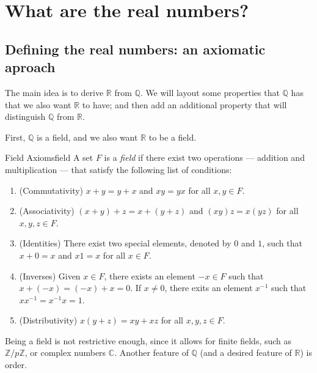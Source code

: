 \chapter{What are the real numbers?}
\section{Defining the real numbers: an axiomatic aproach}

The main idea is to derive \(\mathbb{R}\) from \(\mathbb{Q}\). We will layout some properties that \(\mathbb{Q}\) has that we also want \(\mathbb{R}\) to have; and then add an additional property that will distinguish \(\mathbb{Q}\) from \(\mathbb{R}\).

First, \(\mathbb{Q}\) is a field, and we also want \(\mathbb{R}\) to be a field.

\begin{defn}{Field Axioms}{field}
	A set \(F\) is a \emph{field} if there exist two operations --- addition and multiplication --- that satisfy the following list of conditions:
	\begin{enumerate}
		\item (Commutativity) \(x + y = y + x\) and \(xy = yx\) for all \(x, y \in F\).
		\item (Associativity) \((x+y)+z = x+(y+z)\) and \((xy)z=x(yz)\) for all \(x, y, z \in F\).
		\item (Identities) There exist two special elements, denoted by \(0\) and \(1\), such that \(x + 0 = x\) and \(x1 = x\) for all \(x \in F\).
		\item (Inverses) Given \(x \in F\), there exists an element \(-x \in F\) such that \(x + (-x) = (-x) + x = 0\). If \(x \neq 0\), there exits an element \(x^{-1}\) such that \(xx^{-1} = x^{-1}x = 1\).
		\item (Distributivity) \(x(y+z) = xy + xz\) for all \(x, y, z \in F\).
	\end{enumerate}
\end{defn}

Being a field is not restrictive enough, since it allows for finite fields, such as \(\mathbb{Z}/p\mathbb{Z}\), or complex numbers \(\mathbb{C}\). Another feature of \(\mathbb{Q}\) (and a desired feature of \(\mathbb{R}\)) is order.

